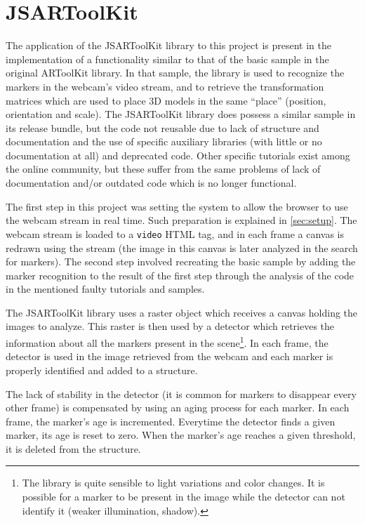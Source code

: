 \section{JSARToolKit}
\label{sec:jsartoolkit}

The application of the JSARToolKit library to this project is present in the implementation of a functionality similar to that of the basic sample in the original ARToolKit library. In that sample, the library is used to recognize the markers in the webcam's video stream, and to retrieve the transformation matrices which are used to place 3D models in the same ``place'' (position, orientation and scale). The JSARToolKit library does possess a similar sample in its release bundle, but the code not reusable due to lack of structure and documentation and the use of specific auxiliary libraries (with little or no documentation at all) and deprecated code. Other specific tutorials exist among the online community, but these suffer from the same problems of lack of documentation and/or outdated code which is no longer functional.

The first step in this project was setting the system to allow the browser to use the webcam stream in real time. Such preparation is explained in \cref{sec:setup}. The webcam stream is loaded to a \texttt{video} HTML tag, and in each frame a canvas is redrawn using the stream (the image in this canvas is later analyzed in the search for markers). The second step involved recreating the basic sample by adding the marker recognition to the result of the first step through the analysis of the code in the mentioned faulty tutorials and samples.

The JSARToolKit library uses a raster object which receives a canvas holding the images to analyze. This raster is then used by a detector which retrieves the information about all the markers present in the scene\footnote{The library is quite sensible to light variations and color changes. It is possible for a marker to be present in the image while the detector can not identify it (weaker illumination, shadow).}. In each frame, the detector is used in the image retrieved from the webcam and each marker is properly identified and added to a structure.

The lack of stability in the detector (it is common for markers to disappear every other frame) is compensated by using an aging process for each marker. In each frame, the marker's age is incremented. Everytime the detector finds a given marker, its age is reset to zero. When the marker's age reaches a given threshold, it is deleted from the structure.


